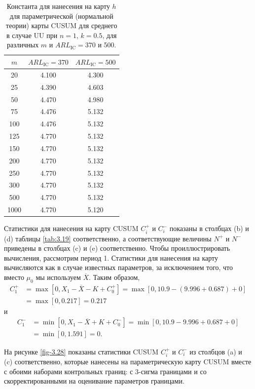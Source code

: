 \begin{table}[htbp]
	\centering
	\caption{Константа для нанесения на карту \(h\) для параметрической (нормальной теории) карты CUSUM для среднего в случае UU при \(n = 1\), \(k = 0.5\), для различных \(m\) и \(ARL_{\text{IC}} = 370\) и 500.}
	\label{tab:3.18}
	\begin{tabular}{ccc}
		\toprule
		\(m\) & \(ARL_{\text{IC}} = 370\) & \(ARL_{\text{IC}} = 500\) \\
		\midrule
		20   & 4.100 & 4.300 \\
		25   & 4.390 & 4.603 \\
		50   & 4.470 & 4.980 \\
		75   & 4.476 & 5.132 \\
		100  & 4.476 & 5.132 \\
		125  & 4.770 & 5.132 \\
		150  & 4.770 & 5.132 \\
		200  & 4.770 & 5.132 \\
		250  & 4.770 & 5.132 \\
		300  & 4.770 & 5.132 \\
		500  & 4.770 & 5.132 \\
		1000 & 4.770 & 5.120 \\
		\bottomrule
	\end{tabular}
\end{table}

Статистики для нанесения на карту CUSUM \(C_i^+\) и \(C_i^-\) показаны в столбцах (b) и (d) таблицы \ref{tab:3.19} соответственно, а соответствующие величины \(N^+\) и \(N^-\) приведены в столбцах (c) и (e) соответственно. Чтобы проиллюстрировать вычисления, рассмотрим период 1. Статистики для нанесения на карту вычисляются как в случае известных параметров, за исключением того, что вместо \(\mu_0\) мы используем \(\overline{X}\). Таким образом,
\[
\begin{aligned}
	C_1^+ &= \max[0, X_1 - \overline{X} - K + C_0^+] = \max[0, 10.9 - (9.996 + 0.687) + 0] \\
	      &= \max[0, 0.217] = 0.217
\end{aligned}
\]
и
\[
\begin{aligned}
	C_1^- &= \min[0, X_1 - \overline{X} + K + C_0^-] = \min[0, 10.9 - 9.996 + 0.687 + 0] \\
	      &= \min[0, 1.591] = 0.
\end{aligned}
\]

На рисунке \ref{fig-3.28} показаны статистики CUSUM \(C_i^+\) и \(C_i^-\) из столбцов (a) и (c) соответственно, которые нанесены на параметрическую карту CUSUM вместе с обоими наборами контрольных границ: с 3-сигма границами и со скорректированными на оценивание параметров границами.

